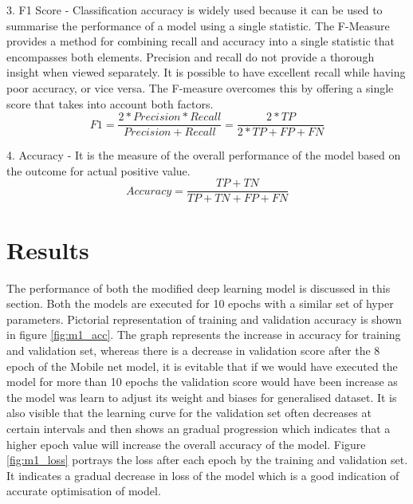 \documentclass[12pt, a4paper,twoside]{report}
\theoremstyle{plain} %
\theoremstyle{definition} %
\theoremstyle{remark} %
\numberwithin{equation}{chapter}
\begin{document}
3. F1 Score - Classification accuracy is widely used because it can be used to summarise the performance of a model using a single statistic. The F-Measure provides a method for combining recall and accuracy into a single statistic that encompasses both elements. Precision and recall do not provide a thorough insight when viewed separately. It is possible to have excellent recall while having poor accuracy, or vice versa. The F-measure overcomes this by offering a single score that takes into account both factors.
\begin{equation}
    F1 = \frac{2*Precision*Recall}{Precision+Recall} = \frac{2*TP}{2*TP+FP+FN}
\end{equation}

4. Accuracy - It is the measure of the overall performance of the model based on the outcome for actual positive value.
\begin{equation}
    Accuracy = \frac{TP+TN}{TP+TN+FP+FN}
\end{equation}

\section{Results}\label{sec:4.3}
The performance of both the modified deep learning model is discussed in this section. Both the models are executed for 10 epochs with a similar set of hyper parameters. Pictorial representation of training and validation accuracy is shown in figure \ref{fig:m1_acc}. The graph represents the increase in accuracy for training and validation set, whereas there is a decrease in validation score after the 8 epoch of the Mobile net model, it is evitable that if we would have executed the model for more than 10 epochs the validation score would have been increase as the model was learn to adjust its weight and biases for generalised dataset. It is also visible that the learning curve for the validation set often decreases at certain intervals and then shows an gradual progression which indicates that a higher epoch value will increase the overall accuracy of the model. Figure \ref{fig:m1_loss} portrays the loss after each epoch by the training and validation set. It indicates a gradual decrease in loss of the model which is a good indication of accurate optimisation of model. 
\end{document}
